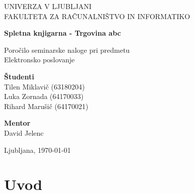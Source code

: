 \documentclass[a4paper,12pt]{report}
\newcommand{\naslov}     {Spletna knjigarna - Trgovina abc}
\newcommand{\prviavtor}  {Tilen Miklavič}
\newcommand{\prviindeks} {63180204}
\newcommand{\drugiavtor} {Luka Zornada}
\newcommand{\drugiindeks}{64170033}
\newcommand{\tretjiavtor} {Rihard Marušič}
\newcommand{\tretjiindeks}{64170021}
\newcommand{\kraj}       {Ljubljana}
\begin{document}
\begin{titlepage}
	\begin{center}
	{UNIVERZA V LJUBLJANI\\[10pt] 
	FAKULTETA ZA RAČUNALNIŠTVO IN INFORMATIKO}

	\vspace{65mm}

	{\Large\textbf{\naslov}}

	\vspace{10mm}

	{\large Poročilo seminarske naloge pri predmetu\\[10pt] Elektronsko poslovanje}

	\vfill
	\vspace{60mm}

\hspace{20mm}
\begin{minipage}[t]{70mm}
	{\bf Študenti}\\
	{\prviavtor} ({\prviindeks})\\ 
	{\drugiavtor} ({\drugiindeks})\\
	{\tretjiavtor} ({\tretjiindeks})
\end{minipage}
\begin{minipage}[t]{50mm}
	{\bf Mentor}\\
	David Jelenc
\end{minipage}

	\vspace{35mm}

	{	\kraj, \today}
	\end{center}
\end{titlepage}


\tableofcontents


\chapter{Uvod}
\end{document}
